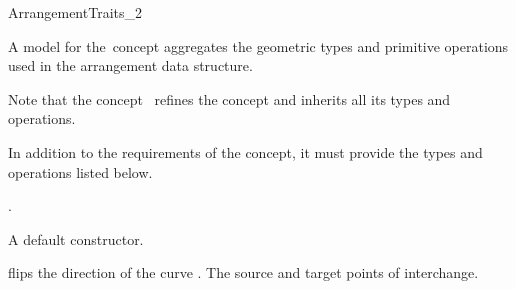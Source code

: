 
\ccRefPageBegin

\begin{ccRefConcept}{ArrangementTraits_2}

\ccDefinition
A model for the\ccRefName\ concept aggregates the geometric types and
primitive operations used in the arrangement
 data structure.

Note that the concept \ccRefName\ refines the concept
 and inherits all its types and
operations.

In addition to the requirements of the 
concept, it must provide the types and operations listed below.

\ccRefines
{}
.


\ccCreation
    
{A default constructor.}

\ccOperations
{}
         {flips the direction of the curve . The source and target
          points of  interchange.}

\ccHasModels
  \\
  \\
   \\

\end{ccRefConcept}

\ccRefPageEnd
